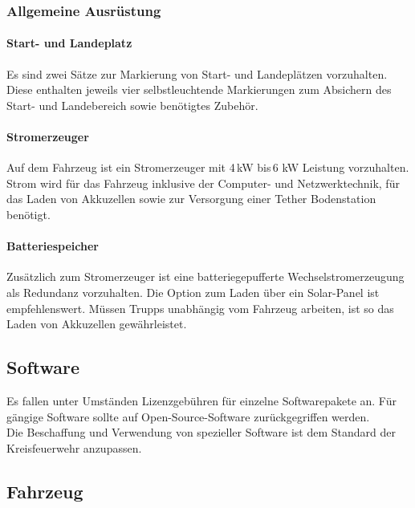 \subsubsection{Allgemeine Ausrüstung}

\paragraph{Start- und Landeplatz}

Es sind zwei Sätze zur Markierung von Start- und Landeplätzen vorzuhalten. Diese enthalten jeweils vier selbstleuchtende Markierungen zum Absichern des Start- und Landebereich sowie benötigtes Zubehör.

\paragraph{Stromerzeuger}

Auf dem Fahrzeug ist ein Stromerzeuger mit 4\,kW bis\,6 kW Leistung vorzuhalten. Strom wird für das Fahrzeug inklusive der Computer- und Netzwerktechnik, für das Laden von Akkuzellen sowie zur Versorgung einer Tether Bodenstation benötigt.

\paragraph{Batteriespeicher}

Zusätzlich zum Stromerzeuger ist eine batteriegepufferte Wechselstromerzeugung als Redundanz vorzuhalten. Die Option zum Laden über ein Solar-Panel ist empfehlenswert. Müssen Trupps unabhängig vom Fahrzeug arbeiten, ist so das Laden von Akkuzellen gewährleistet.

\subsection{Software}

Es fallen unter Umständen Lizenzgebühren für einzelne Softwarepakete an. Für gängige Software sollte auf Open-Source-Software zurückgegriffen werden.\\

\noindent Die Beschaffung und Verwendung von spezieller Software ist dem Standard der Kreisfeuerwehr \district{} anzupassen.

\subsection{Fahrzeug}

